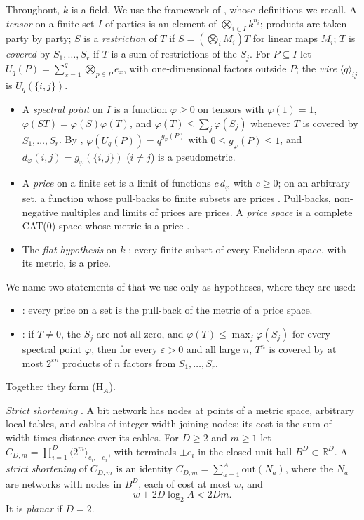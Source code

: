 \documentclass[11pt,a4paper]{article}
\theoremstyle{definition}
\newcommand{\R}{\mathbb{R}}
\newcommand{\kk}{k}
\newcommand{\wire}[2]{\langle #1\rangle_{#2}}
\newcommand{\CS}{\textup{C3}}
\newcommand{\AS}{\textup{A6}}
\begin{document}
Throughout, $\kk$ is a field. We use the framework of \cite{Ant}, whose
definitions we recall. A \emph{tensor} on a finite set $I$ of parties is an
element of $\bigotimes_{i\in I}\kk^{n_i}$; products are taken party by party; $S$
is a \emph{restriction} of $T$ if $S=(\bigotimes_i M_i)T$ for linear maps $M_i$;
$T$ is \emph{covered} by $S_1,\dots,S_r$ if $T$ is a sum of restrictions of the
$S_j$. For $P\subseteq I$ let $U_q(P)=\sum_{x=1}^q\bigotimes_{p\in P}e_x$, with
one-dimensional factors outside $P$; the \emph{wire} $\wire{q}{ij}$ is
$U_q(\{i,j\})$.
\begin{itemize}
\item A \emph{spectral point} on $I$ \cite[Def.~A.1, p.~19]{Ant} is a function
$\varphi\ge0$ on tensors with $\varphi(1)=1$, $\varphi(ST)=\varphi(S)\varphi(T)$,
and $\varphi(T)\le\sum_j\varphi(S_j)$ whenever $T$ is covered by
$S_1,\dots,S_r$. By \cite[Lemma~A.2]{Ant}, $\varphi(U_q(P))=q^{g_\varphi(P)}$
with $0\le g_\varphi(P)\le1$, and $d_\varphi(i,j)=g_\varphi(\{i,j\})$ ($i\ne j$)
is a pseudometric.
\item A \emph{price} on a finite set is a limit of functions $c\,d_\varphi$ with
$c\ge0$; on an arbitrary set, a function whose pull-backs to finite subsets are
prices \cite[Def.~A.4, p.~20]{Ant}. Pull-backs, non-negative multiples and limits
of prices are prices. A \emph{price space} is a complete CAT(0) space whose
metric is a price \cite[App.~C, p.~28]{Ant}.
\item The \emph{flat hypothesis} on $\kk$ \cite[Def.~2.1 and Def.~D.1]{Ant}: every
finite subset of every Euclidean space, with its metric, is a price.
\end{itemize}
We name two statements of \cite{Ant} that we use only as hypotheses, where they
are used:
\begin{itemize}
\item[(\CS)] \cite[Prop.~C.3, p.~28]{Ant}: every price on a set is the pull-back
of the metric of a price space.
\item[(\AS)] \cite[Thm.~A.6, pp.~20--21]{Ant}: if $T\ne0$, the $S_j$ are not all
zero, and $\varphi(T)\le\max_j\varphi(S_j)$ for every spectral point $\varphi$,
then for every $\varepsilon>0$ and all large $n$, $T^n$ is covered by at most
$2^{\varepsilon n}$ products of $n$ factors from $S_1,\dots,S_r$.
\end{itemize}
Together they form (H$_A$).

\emph{Strict shortening} \cite[Def.~2.1, \S2]{OAI}. A bit network has nodes at
points of a metric space, arbitrary local tables, and cables of integer width
joining nodes; its cost is the sum of width times distance over its cables. For
$D\ge2$ and $m\ge1$ let $C_{D,m}=\prod_{i=1}^D\wire{2^m}{e_i,-e_i}$, with
terminals $\pm e_i$ in the closed unit ball $B^D\subset\R^D$. A \emph{strict
shortening} of $C_{D,m}$ is an identity $C_{D,m}=\sum_{a=1}^A\mathrm{out}(N_a)$,
where the $N_a$ are networks with nodes in $B^D$, each of cost at most $w$, and
\[
w+2D\log_2A<2Dm .
\]
It is \emph{planar} if $D=2$.
\end{document}
